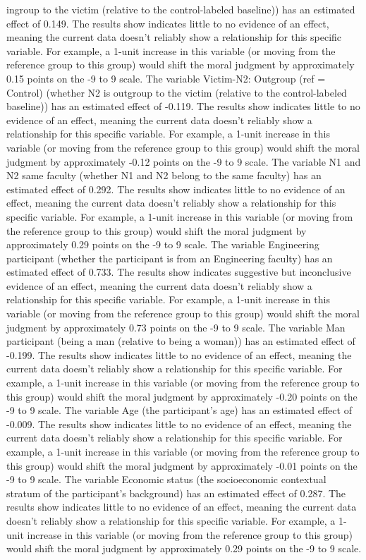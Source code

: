 \documentclass[11pt]{article}
\begin{document}
ingroup to the victim (relative to the control-labeled baseline)) has an estimated effect of 0.149. The results show indicates little to no evidence of an effect, meaning the current data doesn't reliably show a relationship for this specific variable. For example, a 1-unit increase in this variable (or moving from the reference group to this group) would shift the moral judgment by approximately 0.15 points on the -9 to 9 scale. The variable Victim-N2: Outgroup (ref = Control) (whether N2 is outgroup to the victim (relative to the control-labeled baseline)) has an estimated effect of -0.119. The results show indicates little to no evidence of an effect, meaning the current data doesn't reliably show a relationship for this specific variable. For example, a 1-unit increase in this variable (or moving from the reference group to this group) would shift the moral judgment by approximately -0.12 points on the -9 to 9 scale. The variable N1 and N2 same faculty (whether N1 and N2 belong to the same faculty) has an estimated effect of 0.292. The results show indicates little to no evidence of an effect, meaning the current data doesn't reliably show a relationship for this specific variable. For example, a 1-unit increase in this variable (or moving from the reference group to this group) would shift the moral judgment by approximately 0.29 points on the -9 to 9 scale. The variable Engineering participant (whether the participant is from an Engineering faculty) has an estimated effect of 0.733. The results show indicates suggestive but inconclusive evidence of an effect, meaning the current data doesn't reliably show a relationship for this specific variable. For example, a 1-unit increase in this variable (or moving from the reference group to this group) would shift the moral judgment by approximately 0.73 points on the -9 to 9 scale. The variable Man participant (being a man (relative to being a woman)) has an estimated effect of -0.199. The results show indicates little to no evidence of an effect, meaning the current data doesn't reliably show a relationship for this specific variable. For example, a 1-unit increase in this variable (or moving from the reference group to this group) would shift the moral judgment by approximately -0.20 points on the -9 to 9 scale. The variable Age (the participant's age) has an estimated effect of -0.009. The results show indicates little to no evidence of an effect, meaning the current data doesn't reliably show a relationship for this specific variable. For example, a 1-unit increase in this variable (or moving from the reference group to this group) would shift the moral judgment by approximately -0.01 points on the -9 to 9 scale. The variable Economic status (the socioeconomic contextual stratum of the participant's background) has an estimated effect of 0.287. The results show indicates little to no evidence of an effect, meaning the current data doesn't reliably show a relationship for this specific variable. For example, a 1-unit increase in this variable (or moving from the reference group to this group) would shift the moral judgment by approximately 0.29 points on the -9 to 9 scale.
\end{document}
